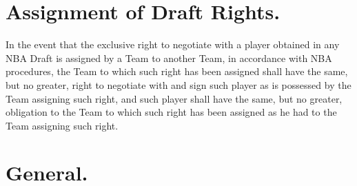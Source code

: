 \documentclass[
]{book}
\begin{document}
\hypertarget{assignment-of-draft-rights.}{%
\section{Assignment of Draft Rights.}\label{assignment-of-draft-rights.}}

In the event that the exclusive right to negotiate with a player obtained in any NBA Draft is assigned by a Team to another Team, in accordance with NBA procedures, the Team to which such right has been assigned shall have the same, but no greater, right to negotiate with and sign such player as is possessed by the Team assigning such right, and such player shall have the same, but no greater, obligation to the Team to which such right has been assigned as he had to the Team assigning such right.

\hypertarget{general.-2}{%
\section{General.}\label{general.-2}}
\end{document}
